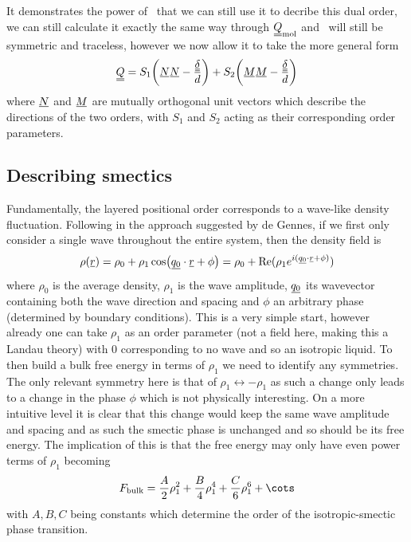 \documentclass[12pt]{article}
\newcommand{\suf}[2]{\stackunder[1pt]{\ensuremath{#1}}{\rule{\widthof{\ensuremath{#2}}*\real{0.9}}{.1ex}}}
\newcommand{\duf}[2]{\stackunder[1pt]{\suf{\ensuremath{#1}}{#2}}{\rule{\widthof{\ensuremath{#2}}*\real{0.9}}{.1ex}}}
\newcommand{\su}[1]{\suf{#1}{#1}}
\newcommand{\du}[1]{\duf{#1}{#1}}
\newcommand{\ssu}[1]{\scriptsize\su{#1}\normalsize}
\newcommand{\QQ}{\du{Q}}
\newcommand{\dudelta}{\du{\delta}}
\begin{document}
It demonstrates the power of \QQ\ that we can still use it to decribe this dual order, we can still calculate it exactly the same way through $\du{Q}_\text{mol}$ and \QQ\ will still be symmetric and traceless, however we now allow it to take the more general form
\begin{equation}
    \du{Q} = S_1\qty(\su{N} \su{N} - \frac{\dudelta}{d}) + S_2\qty(\su{M} \su{M} - \frac{\dudelta}{d})
\end{equation}
where $\su{N}$ and $\su{M}$ are mutually orthogonal unit vectors which describe the directions of the two orders, with $S_1$ and $S_2$ acting as their corresponding order parameters.


\subsection{Describing smectics\cite{oswaldSmecticColumnarLiquid2005}}\label{sec:degennes}
Fundamentally, the layered positional order corresponds to a wave-like density fluctuation.
Following \cite{oswaldSmecticColumnarLiquid2005} in the approach suggested by de Gennes, if we first only consider a single wave throughout the entire system, then the density field is
\begin{equation}\label{eq:density_base}
    \rho(\su{r}) = \rho_0 + \rho_1\cos(\su{q_0}\cdot\su{r} + \phi) = \rho_0 + \Re(\rho_1 e^{i(\ssu{q_0} \cdot \ssu{r} + \phi)})
\end{equation}
where $\rho_0$ is the average density, $\rho_1$ is the wave amplitude, $\su{q_0}$ its wavevector containing both the wave direction and spacing and $\phi$ an arbitrary phase (determined by boundary conditions).
This is a very simple start, however already one can take $\rho_1$ as an order parameter (not a field here, making this a Landau theory) with 0 corresponding to no wave and so an isotropic liquid.
To then build a bulk free energy in terms of $\rho_1$ we need to identify any symmetries.
The only relevant symmetry here is that of $\rho_1 \leftrightarrow -\rho_1$ as such a change only leads to a change in the phase $\phi$ which is not physically interesting.
On a more intuitive level it is clear that this change would keep the same wave amplitude and spacing and as such the smectic phase is unchanged and so should be its free energy.
The implication of this is that the free energy may only have even power terms of $\rho_1$ becoming
\begin{equation}
    F_\text{bulk} = \frac{A}{2}\rho_1^2 + \frac{B}{4}\rho_1^4 + \frac{C}{6}\rho_1^6 + \cots
\end{equation}
with $A, B, C$ being constants which determine the order of the isotropic-smectic phase transition\cite{oswaldSmecticColumnarLiquid2005}.
\end{document}
